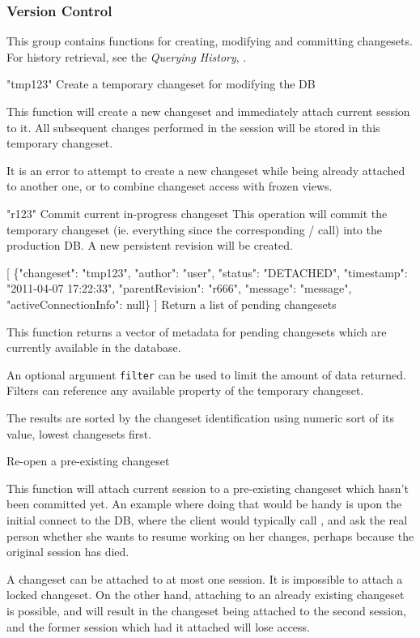 \documentclass[deska]{subfiles}
\begin{document}
\subsubsection{Version Control}
\label{sec:api-group-vcs}

This group contains functions for creating, modifying and committing changesets.  For history retrieval, see the {\em
Querying History}, .

    {"tmp123"}
    {Create a temporary changeset for modifying the DB}
    {This function will create a new changeset and immediately attach current session to it.  All subsequent changes
    performed in the session will be stored in this temporary changeset.

    It is an error to attempt to create a new changeset while being already attached to another one, or to combine
    changeset access with frozen views.
    }

    {"r123"}
    {Commit current in-progress changeset}
    {This operation will commit the temporary changeset (ie. everything since the corresponding
    / call) into the production DB.  A new persistent
    revision will be created.}

    {[
     \{"changeset": "tmp123", "author": "user", "status": "DETACHED", "timestamp": "2011-04-07 17:22:33",
     "parentRevision": "r666", "message": "message", \\ "activeConnectionInfo": null\}
    ]}
    {Return a list of pending changesets}
    {This function returns a vector of metadata for pending changesets which are currently available in the
    database.

    An optional argument {\tt filter} can be used to limit the amount of data returned.  Filters can reference any
    available property of the temporary changeset.

    The results are sorted by the changeset identification using numeric sort of its value, lowest changesets first.}

    {}
    {Re-open a pre-existing changeset}
    {This function will attach current session to a pre-existing changeset which hasn't been committed yet. An example
    where doing that would be handy is upon the initial connect to the DB, where the client would typically call
    , and ask the real person whether she wants to resume working on her changes,
    perhaps because the original session has died.

    A changeset can be attached to at most one session.  It is impossible to attach a locked changeset.  On the other
    hand, attaching to an already existing changeset is possible, and will result in the changeset being attached to the
    second session, and the former session which had it attached will lose access.
    }
\end{document}
